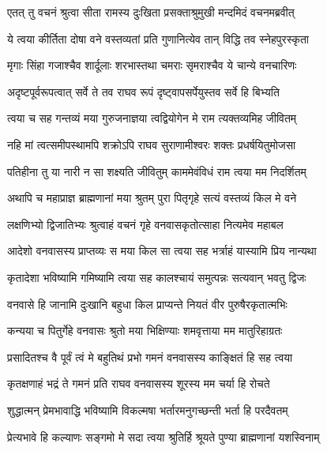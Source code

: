 
\twolineshloka
{एतत् तु वचनं श्रुत्वा सीता रामस्य दुःखिता}
{प्रसक्ताश्रुमुखी मन्दमिदं वचनमब्रवीत्} %

\twolineshloka
{ये त्वया कीर्तिता दोषा वने वस्तव्यतां प्रति}
{गुणानित्येव तान् विद्धि तव स्नेहपुरस्कृता} %

\twolineshloka
{मृगाः सिंहा गजाश्चैव शार्दूलाः शरभास्तथा}
{चमराः सृमराश्चैव ये चान्ये वनचारिणः} %

\twolineshloka
{अदृष्टपूर्वरूपत्वात् सर्वे ते तव राघव}
{रूपं दृष्ट्वापसर्पेयुस्तव सर्वे हि बिभ्यति} %

\twolineshloka
{त्वया च सह गन्तव्यं मया गुरुजनाज्ञया}
{त्वद्वियोगेन मे राम त्यक्तव्यमिह जीवितम्} %

\twolineshloka
{नहि मां त्वत्समीपस्थामपि शक्रोऽपि राघव}
{सुराणामीश्वरः शक्तः प्रधर्षयितुमोजसा} %

\twolineshloka
{पतिहीना तु या नारी न सा शक्ष्यति जीवितुम्}
{काममेवंविधं राम त्वया मम निदर्शितम्} %

\twolineshloka
{अथापि च महाप्राज्ञ ब्राह्मणानां मया श्रुतम्}
{पुरा पितृगृहे सत्यं वस्तव्यं किल मे वने} %

\twolineshloka
{लक्षणिभ्यो द्विजातिभ्यः श्रुत्वाहं वचनं गृहे}
{वनवासकृतोत्साहा नित्यमेव महाबल} %

\twolineshloka
{आदेशो वनवासस्य प्राप्तव्यः स मया किल}
{सा त्वया सह भर्त्राहं यास्यामि प्रिय नान्यथा} %

\twolineshloka
{कृतादेशा भविष्यामि गमिष्यामि त्वया सह}
{कालश्चायं समुत्पन्नः सत्यवान् भवतु द्विजः} %

\twolineshloka
{वनवासे हि जानामि दुःखानि बहुधा किल}
{प्राप्यन्ते नियतं वीर पुरुषैरकृतात्मभिः} %

\twolineshloka
{कन्यया च पितुर्गेहे वनवासः श्रुतो मया}
{भिक्षिण्याः शमवृत्ताया मम मातुरिहाग्रतः} %

\twolineshloka
{प्रसादितश्च वै पूर्वं त्वं मे बहुतिथं प्रभो}
{गमनं वनवासस्य काङ्क्षितं हि सह त्वया} %

\twolineshloka
{कृतक्षणाहं भद्रं ते गमनं प्रति राघव}
{वनवासस्य शूरस्य मम चर्या हि रोचते} %

\twolineshloka
{शुद्धात्मन् प्रेमभावाद्धि भविष्यामि विकल्मषा}
{भर्तारमनुगच्छन्ती भर्ता हि परदैवतम्} %

\twolineshloka
{प्रेत्यभावे हि कल्याणः सङ्गमो मे सदा त्वया}
{श्रुतिर्हि श्रूयते पुण्या ब्राह्मणानां यशस्विनाम्} %

